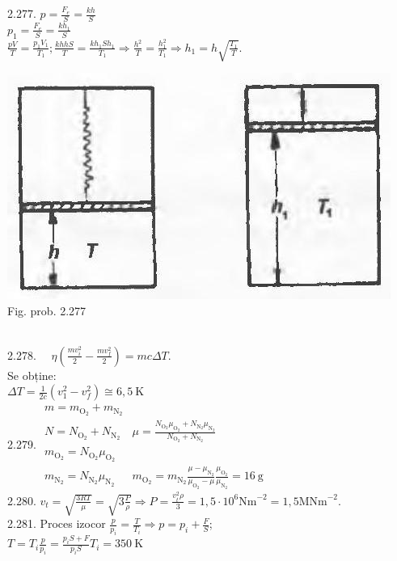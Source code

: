 2.277. $p=\frac{F_{e}}{S}=\frac{k h}{S}$\\ $p_{1}=\frac{F_{e}}{S}=\frac{k h_{1}}{S}$\\ $\frac{p V}{T}=\frac{p_{1} V_{1}}{T_{1}} ; \frac{k h h S}{T}=\frac{k h_{1} S h_{1}}{T_{1}} \Rightarrow \frac{h^{2}}{T}=\frac{h_{1}^{2}}{T_{1}} \Rightarrow h_{1}=h \sqrt{\frac{T_{1}}{T}} .$\\ \begin{center} \includegraphics[width=0.4\linewidth]{images/2025_07_01_5b3ff9fa0d508c8e9f17g-332}\\ Fig. prob. 2.277 \end{center}\\

2.278. $\quad \eta\left(\frac{m v_{i}^{2}}{2}-\frac{m v_{f}^{2}}{2}\right)=m c \Delta T$.\\ Se obține:\\ $\Delta T=\frac{1}{2 c}\left(v_{1}^{2}-v_{f}^{2}\right) \cong 6,5 \mathrm{~K}$\\

2.279. $\begin{array}{ll} m=m_{\mathrm{O}_{2}}+m_{\mathrm{N}_{2}}\\ N=N_{\mathrm{O}_{2}}+N_{\mathrm{N}_{2}} & \mu=\frac{N_{\mathrm{O}_{2}} \mu_{\mathrm{O}_{2}}+N_{\mathrm{N}_{2}} \mu_{\mathrm{N}_{2}}}{N_{\mathrm{O}_{2}}+N_{\mathrm{N}_{2}}} \\ m_{\mathrm{O}_{2}}=N_{\mathrm{O}_{2}} \mu_{\mathrm{O}_{2}}\\ m_{\mathrm{N}_{2}}=N_{\mathrm{N}_{2}} \mu_{\mathrm{N}_{2}} & m_{\mathrm{O}_{2}}=m_{\mathrm{N}_{2}} \frac{\mu-\mu_{\mathrm{N}_{2}}}{\mu_{\mathrm{O}_{2}}-\mu} \frac{\mu_{\mathrm{O}_{2}}}{\mu_{\mathrm{N}_{2}}}=16 \mathrm{~g} \end{array}$\\

2.280. $v_{t}=\sqrt{\frac{3 R T}{\mu}}=\sqrt{3 \frac{P}{\rho}} \Rightarrow P=\frac{v_{t}^{2} \rho}{3}=1,5 \cdot 10^{6} \mathrm{Nm}^{-2}=1,5 \mathrm{MNm}^{-2}$.\\

2.281. Proces izocor $\frac{p}{p_{i}}=\frac{T}{T_{i}} \Rightarrow p=p_{i}+\frac{F}{S}$;\\ $T=T_{i} \frac{p}{p_{i}}=\frac{p_{i} S+F}{p_{i} S} T_{i}=350 \mathrm{~K}$\\

